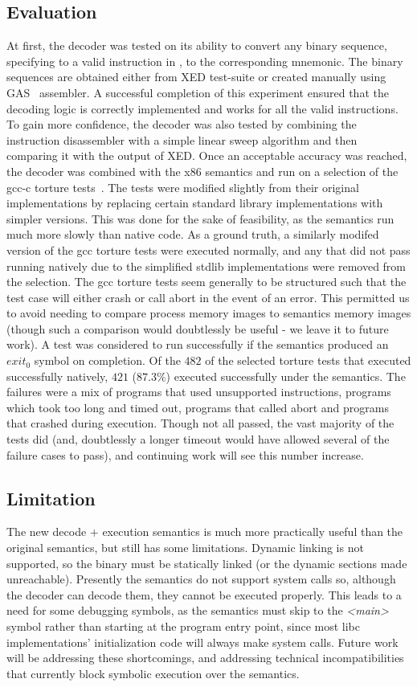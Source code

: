 \subsection{Evaluation}
At first, the decoder was tested on its ability to  convert any binary sequence, specifying to a valid instruction in \ISA, to the corresponding mnemonic. The binary sequences are  obtained either from XED test-suite or created manually using GAS~\cite{gas} assembler. A successful completion of this experiment ensured that the decoding logic is correctly implemented and works for all the valid \ISA instructions. To gain more confidence, the decoder was also tested by combining the instruction disassembler with a simple linear sweep algorithm and then comparing it with the output of XED.  Once an acceptable accuracy was reached, the decoder was combined with the x86 semantics and run on a selection of the gcc-c torture tests~\cite{CTORTURE}. The tests were modified slightly from their original implementations by replacing certain standard library implementations with simpler versions.  This was done for the sake of feasibility, as the semantics run much more slowly than native code.  As a ground truth, a similarly modifed version of the gcc torture tests were executed normally, and any that did not pass running natively due to the simplified stdlib implementations were removed from the selection.  The gcc torture tests seem generally to be structured such that the test case will either crash or call abort in the event of an error.  This permitted us to avoid needing to compare process memory images to semantics memory images (though such a comparison would doubtlessly be useful - we leave it to future work).  A test was considered to run successfully if the semantics produced an $exit_0$ symbol on completion.  Of the $482$ of the selected torture tests that executed successfully natively, $421$ ($87.3\%$) executed successfully under the semantics.  The failures were a mix of programs that used unsupported instructions, programs which took too long and timed out, programs that called abort and programs that crashed during execution.  Though not all passed, the vast majority of the tests did (and, doubtlessly a longer timeout would have allowed several of the failure cases to pass), and continuing work will see this number increase.

\subsection{Limitation}
The new decode $+$ execution semantics is much more practically useful than the original semantics, but still has some limitations.  Dynamic linking is not supported, so the binary must be statically linked (or the dynamic sections made unreachable).  Presently the semantics do not support system calls so, although the decoder can decode them, they cannot be executed properly.  This leads to a need for some debugging symbols, as the semantics must skip to the \emph{<main>} symbol rather than starting at the program entry point, since most libc implementations’ initialization code will always make system calls.  Future work will be addressing these shortcomings, and addressing technical incompatibilities that currently block symbolic execution over the semantics.

